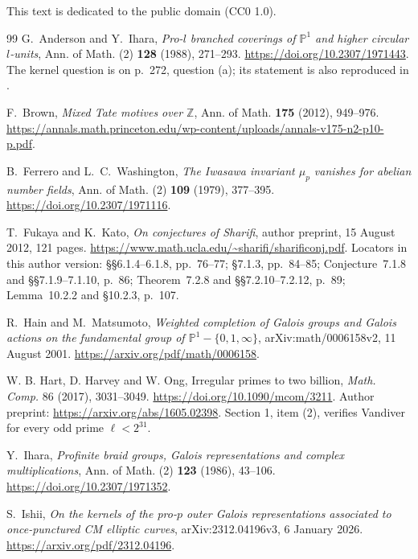 \documentclass[11pt]{article}
\theoremstyle{definition}
\numberwithin{equation}{section}
\begin{document}
\smallskip
This text is dedicated to the public domain (CC0 1.0).

\begingroup
\small
\begin{thebibliography}{99}
G.~Anderson and Y.~Ihara, \emph{Pro-$l$ branched coverings of $\mathbb P^1$ and higher circular $l$-units},
Ann. of Math. (2) \textbf{128} (1988), 271--293.
\url{https://doi.org/10.2307/1971443}.
The kernel question is on p.~272, question (a); its statement is also reproduced in
\cite[p.~2]{IshiiKernel2026}.

F.~Brown, \emph{Mixed Tate motives over $\mathbb Z$},
Ann. of Math. \textbf{175} (2012), 949--976.
\url{https://annals.math.princeton.edu/wp-content/uploads/annals-v175-n2-p10-p.pdf}.

B.~Ferrero and L.~C.~Washington,
\emph{The Iwasawa invariant $\mu_p$ vanishes for abelian number fields},
Ann. of Math. (2) \textbf{109} (1979), 377--395.
\url{https://doi.org/10.2307/1971116}.

T.~Fukaya and K.~Kato,
\emph{On conjectures of Sharifi}, author preprint,
15 August 2012, 121 pages.
\url{https://www.math.ucla.edu/~sharifi/sharificonj.pdf}.
Locators in this author version:
\S\S6.1.4--6.1.8, pp.~76--77;
\S7.1.3, pp.~84--85;
Conjecture~7.1.8 and \S\S7.1.9--7.1.10, p.~86;
Theorem~7.2.8 and \S\S7.2.10--7.2.12, p.~89;
Lemma~10.2.2 and \S10.2.3, p.~107.

R.~Hain and M.~Matsumoto, \emph{Weighted completion of Galois groups
and Galois actions on the fundamental group of $\mathbb P^1-\{0,1,\infty\}$},
arXiv:math/0006158v2, 11 August 2001.
\url{https://arxiv.org/pdf/math/0006158}.

W. B. Hart, D. Harvey and W. Ong,
Irregular primes to two billion,
\emph{Math. Comp.} 86 (2017), 3031--3049.
\url{https://doi.org/10.1090/mcom/3211}.
Author preprint:
\url{https://arxiv.org/abs/1605.02398}.
Section 1, item (2), verifies Vandiver for every odd prime
\(\ell<2^{31}\).

Y.~Ihara, \emph{Profinite braid groups, Galois representations and complex multiplications},
Ann. of Math. (2) \textbf{123} (1986), 43--106.
\url{https://doi.org/10.2307/1971352}.

S.~Ishii, \emph{On the kernels of the pro-$p$ outer Galois representations
associated to once-punctured CM elliptic curves},
arXiv:2312.04196v3, 6 January 2026.
\url{https://arxiv.org/pdf/2312.04196}.


\end{thebibliography}
\end{document}
